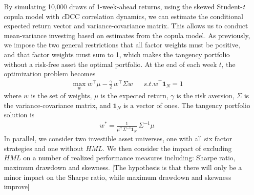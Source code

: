 By simulating 10,000 draws of 1-week-ahead returns, using the skewed Student-\textit{t} copula model with \textit{c}DCC correlation dynamics, we can estimate the conditional expected return vector and variance-covariance matrix. This allows us to conduct mean-variance investing based on estimates from the copula model. As previously, we impose the two general restrictions that all factor weights must be positive, and that factor weights must sum to 1, which makes the tangency portfolio without a risk-free asset the optimal portfolio. At the end of each week $t$, the optimization problem becomes
\begin{align}
    \max_{w} w^\top \mu - \frac{\gamma}{2}\,w^\top \Sigma w && s.t. w^\top \mathbf{1}_N = 1
\end{align}
where $w$ is the set of weights, $\mu$ is the expected return, $\gamma$ is the risk aversion, $\Sigma$ is the variance-covariance matrix, and $\mathbf{1}_N$ is a vector of ones. The tangency portfolio solution is
\begin{align}
    w^* = \frac{1}{\mu^\top \Sigma^{-1} \mathbf{1}_N} \, \Sigma^{-1} \mu
\end{align}
In parallel, we consider two investible asset universes, one with all six factor strategies and one without $HML$. We then consider the impact of excluding $HML$ on a number of realized performance measures including: Sharpe ratio, maximum drawdown and skewness. [The hypothesis is that there will only be a minor impact on the Sharpe ratio, while maximum drawdown and skewness improve]
